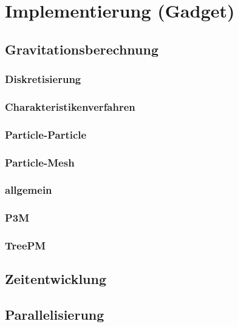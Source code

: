 \documentclass{beamer}
\begin{document}

\section{Implementierung (Gadget)}
\subsection{Gravitationsberechnung}
\subsubsection*{Diskretisierung}
\subsubsection*{Charakteristikenverfahren}
\subsubsection{Particle-Particle}
\subsubsection{Particle-Mesh}
\subsubsection*{allgemein}
\subsubsection*{P3M}
\subsubsection*{TreePM}
\subsection{Zeitentwicklung}
\subsection{Parallelisierung}
\end{document}
